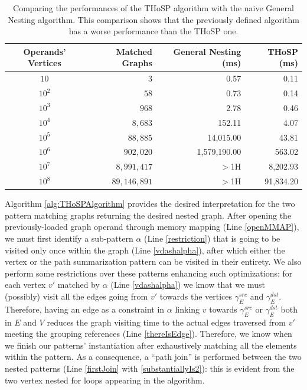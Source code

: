 \begin{table}[!t]
	\centering
\begin{tabular}{@{}cr|rr@{}}
	\toprule
	{\textbf{Operands' Vertices}} & Matched Graphs  & {\textbf{General Nesting} (ms)} & {\textbf{THoSP} (ms)}  \\	
	\midrule
	$10$ & $3$ &  0.57       & 0.11\\
	$10^2$ & $58$  & 0.73        & 0.14\\
	$10^3$  & $968$  & 2.78   & 0.46\\
	$10^4$ & $8,683$   & 152.11   & 4.07\\
	$10^5$ & $88,885$   & 14,015.00 & 43.81 \\
	$10^6$  & $902,020$  &  1,579,190.00      & 563.02\\
	$10^7$ & $8,991,417$   &  $>$1H      & 8,202.93\\
	$10^8$ & $89,146,891$   &  $>$1H      & 91,834.20\\
	\bottomrule
\end{tabular}
	\caption{Comparing the performances of the THoSP algorithm with the naive General Nesting algorithm. This comparison shows that the previously defined algorithm has a worse performance than the THoSP one. }
	\label{tab:comparisonTwo}
\end{table}


Algorithm \ref{alg:THoSPAlgorithm} provides the desired interpretation for the two pattern matching graphs returning the desired nested graph. 
After opening the previously-loaded graph operand through memory mapping (Line \ref{openMMAP}), we must first identify a sub-pattern $\alpha$ (Line \ref{restriction}) that is going to be visited only once within the graph (Line \ref{vdashalpha}), after which either the vertex or the path summarization pattern can be visited in their entirety. We also perform some restrictions over these patterns enhancing such optimizations: for each vertex $v'$ matched by $\alpha$ (Line \ref{vdashalpha}) we know that we must (possibly) visit all the edges going from $v'$ towards the vertices $\gamma_E^{src}$ and $\gamma_E^{dst}$.  Therefore, having an edge as a constraint in $\alpha$ linking $v$ towards $\gamma_E^{src}$ or $\gamma_E^{dst}$ both in $E$ and $V$  reduces the graph visiting time to the actual edges traversed from $v'$ meeting the grouping references (Line \ref{thereIsEdge}). Therefore, we know when we finish  our patterns' instantiation after exhaustively matching all the elements within the pattern.
As a consequence, a ``path join'' is performed between the two nested patterns (Line \ref{firstJoin} with \ref{substantiallyIs2}): this is evident from the two vertex nested for loops appearing in the algorithm.   

